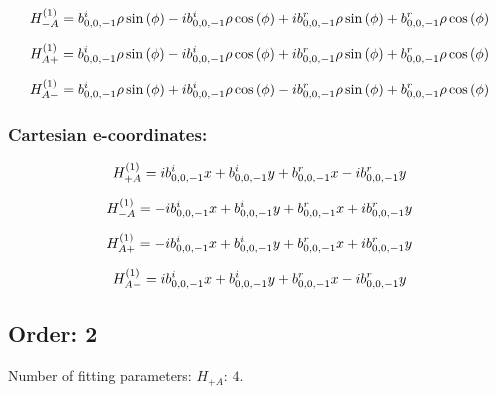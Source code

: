 \documentclass[fleqn]{article}
\begin{document}
\begin{dmath*}
H_{-A}^{(1)}=b^{i}_{0,0,-1} \rho \sin{\left (\phi \right )} -  i b^{i}_{0,0,-1} \rho \cos{\left (\phi \right )} +  i b^{r}_{0,0,-1} \rho \sin{\left (\phi \right )} + b^{r}_{0,0,-1} \rho \cos{\left (\phi \right )}\\
\end{dmath*}

\begin{dmath*}
H_{A+}^{(1)}=b^{i}_{0,0,-1} \rho \sin{\left (\phi \right )} -  i b^{i}_{0,0,-1} \rho \cos{\left (\phi \right )} +  i b^{r}_{0,0,-1} \rho \sin{\left (\phi \right )} + b^{r}_{0,0,-1} \rho \cos{\left (\phi \right )}\\
\end{dmath*}

\begin{dmath*}
H_{A-}^{(1)}=b^{i}_{0,0,-1} \rho \sin{\left (\phi \right )} +  i b^{i}_{0,0,-1} \rho \cos{\left (\phi \right )} -  i b^{r}_{0,0,-1} \rho \sin{\left (\phi \right )} + b^{r}_{0,0,-1} \rho \cos{\left (\phi \right )}\\
\end{dmath*}
\subsubsection*{Cartesian e-coordinates:}

\begin{dmath*}
H_{+A}^{(1)}= i b^{i}_{0,0,-1} x + b^{i}_{0,0,-1} y + b^{r}_{0,0,-1} x -  i b^{r}_{0,0,-1} y\\
\end{dmath*}

\begin{dmath*}
H_{-A}^{(1)}=-  i b^{i}_{0,0,-1} x + b^{i}_{0,0,-1} y + b^{r}_{0,0,-1} x +  i b^{r}_{0,0,-1} y\\
\end{dmath*}

\begin{dmath*}
H_{A+}^{(1)}=-  i b^{i}_{0,0,-1} x + b^{i}_{0,0,-1} y + b^{r}_{0,0,-1} x +  i b^{r}_{0,0,-1} y\\
\end{dmath*}

\begin{dmath*}
H_{A-}^{(1)}= i b^{i}_{0,0,-1} x + b^{i}_{0,0,-1} y + b^{r}_{0,0,-1} x -  i b^{r}_{0,0,-1} y\\
\end{dmath*}
\subsection{Order: 2}
Number of fitting parameters: $H_{+A}$: $4$.
\end{document}
